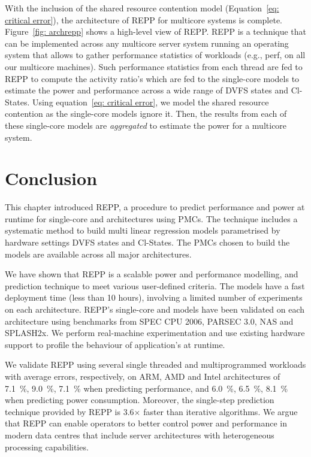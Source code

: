 With the inclusion of the shared resource contention model (Equation~\ref{eq: critical
error}), the architecture of REPP for multicore systems is complete. Figure~\ref{fig:
archrepp} shows a high-level view of REPP. REPP is a technique that can be implemented
across any multicore server system running an operating system that allows to gather
performance statistics of workloads (e.g., \textsf{perf}, on all our multicore machines).
Such performance statistics from each thread are fed to REPP to compute the activity
ratio's which are fed to the single-core models to estimate the power and performance
across a wide range of DVFS states and Cl-States. Using equation~\ref{eq: critical error},
we model the shared resource contention  as the single-core models ignore it.  Then, the
results from each of these single-core models are \textit{aggregated} to estimate the
power for a multicore system. 

\newpage




\section{Conclusion}
\label{subsec: conclusion}

This chapter introduced REPP, a procedure to predict performance and power at runtime for
single-core and \muc architectures using PMCs.  The technique includes a systematic method
to build multi linear regression models parametrised by hardware settings DVFS states and
Cl-States. The PMCs chosen to build the models are available across all major
architectures. 

We have shown that REPP is a scalable power and performance modelling, and prediction
technique to meet various user-defined criteria. The models have a fast deployment time
(less than 10 hours), involving a limited number of experiments on each architecture.
REPP's single-core and \muc models have been validated on each architecture using
benchmarks from SPEC CPU 2006, PARSEC 3.0, NAS and SPLASH2x. We perform real-machine
experimentation and use existing hardware support to profile the behaviour of
application's at runtime.

We validate REPP using several single threaded and multiprogrammed workloads with
average errors, respectively, on ARM, AMD and Intel architectures of \SI{7.1}{\percent},
\SI{9.0}{\percent}, \SI{7.1}{\percent} when predicting performance, and
\SI{6.0}{\percent}, \SI{6.5}{\percent}, \SI{8.1}{\percent} when predicting power
consumption.  Moreover, the single-step prediction technique provided by REPP is
3.6$\times$ faster than iterative algorithms. We argue that REPP can enable
operators to better control power and performance in modern data centres that include
server architectures with heterogeneous processing capabilities. 
